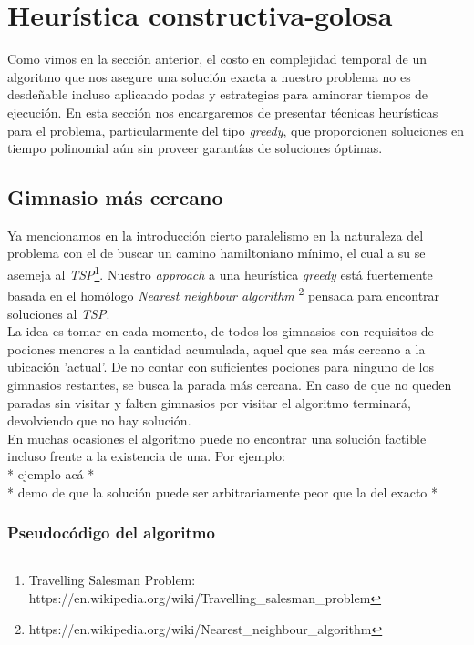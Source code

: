 \section{Heurística constructiva-golosa}
    Como vimos en la sección anterior, el costo en complejidad temporal de un algoritmo que nos asegure una solución exacta a nuestro problema no es desdeñable incluso aplicando podas y estrategias para aminorar tiempos de ejecución. En esta sección nos encargaremos de presentar técnicas heurísticas para el problema, particularmente del tipo \emph{greedy}, que proporcionen soluciones en tiempo polinomial aún sin proveer garantías de soluciones óptimas.

\subsection{Gimnasio más cercano}
    Ya mencionamos en la introducción cierto paralelismo en la naturaleza del problema con el de buscar un camino hamiltoniano mínimo, el cual a su se asemeja al \emph{TSP}\footnote{Travelling Salesman Problem: https://en.wikipedia.org/wiki/Travelling_salesman_problem}. Nuestro \emph{approach} a una heurística \emph{greedy} está fuertemente basada en el homólogo \emph{Nearest neighbour algorithm} \footnote{https://en.wikipedia.org/wiki/Nearest_neighbour_algorithm} pensada para encontrar soluciones al \emph{TSP}.
    \\

    La idea es tomar en cada momento, de todos los gimnasios con requisitos de pociones menores a la cantidad acumulada, aquel que sea más cercano a la ubicación 'actual'. De no contar con suficientes pociones para ninguno de los gimnasios restantes, se busca la parada más cercana. En caso de que no queden paradas sin visitar y falten gimnasios por visitar el algoritmo terminará, devolviendo que no hay solución.
    \\

    En muchas ocasiones el algoritmo puede no encontrar una solución factible incluso frente a la existencia de una. Por ejemplo:
    \\

    {\color{red} * ejemplo acá *}
    \\

    {\color{red} * demo de que la solución puede ser arbitrariamente peor que la del exacto *}

    \subsubsection{Pseudocódigo del algoritmo}

